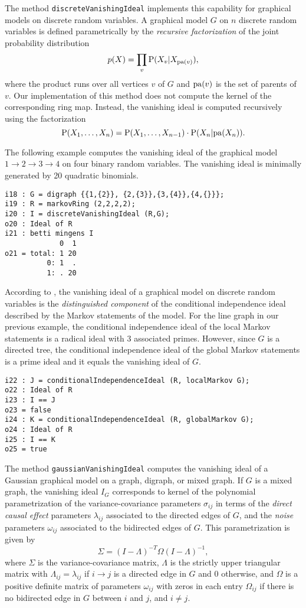 \documentclass[letterpaper]{article}
\theoremstyle{definition}
\newcommand{\pa}{{\rm pa}}
\begin{document}
The method
{\tt discreteVanishingIdeal} implements this capability for graphical
models on discrete random variables. A graphical model $G$ on $n$ discrete random variables 
is defined parametrically by the
\emph{recursive factorization} of the joint probability  distribution
\[p(X) = \prod_{v} {\rm P}(X_{v} | X_{\pa(v)}),\]
where the product runs over all vertices $v$ of $G$ and $\pa(v)$ is the set of
parents of $v$. 
Our implementation of this method does not compute the kernel of the
corresponding ring map. Instead, the vanishing ideal is
computed recursively using the factorization 
\[{\rm P}(X_{1},\dots, X_{n}) = {\rm P}(X_{1},\dots, X_{n-1})\cdot {\rm P}(X_{n} | \pa(X_{n})).\]

The following example computes the vanishing ideal of the graphical model $1\to
2 \to 3\to 4$ on four binary random variables. The vanishing ideal is
minimally generated by 20 quadratic binomials.

\begin{verbatim}
i18 : G = digraph {{1,{2}}, {2,{3}},{3,{4}},{4,{}}};
i19 : R = markovRing (2,2,2,2);
i20 : I = discreteVanishingIdeal (R,G);
o20 : Ideal of R
i21 : betti mingens I
             0  1
o21 = total: 1 20
          0: 1  .
          1: . 20
\end{verbatim}

According to \cite{GSS}, the vanishing ideal of a graphical model on discrete
random variables is the \emph{distinguished
  component} of the conditional independence ideal described by the Markov
statements of the model. For the line graph in our previous example, the
conditional independence ideal of the local Markov statements 
is a radical ideal with 3 associated primes. However, since $G$ is a directed
tree, the conditional independence ideal of the global Markov statements is a
prime ideal and it equals the vanishing ideal of $G$.

 \begin{verbatim}
i22 : J = conditionalIndependenceIdeal (R, localMarkov G);
o22 : Ideal of R
i23 : I == J
o23 = false
i24 : K = conditionalIndependenceIdeal (R, globalMarkov G);
o24 : Ideal of R
i25 : I == K
o25 = true
\end{verbatim}

The method {\tt gaussianVanishingIdeal} computes the vanishing ideal of a
Gaussian graphical model on a graph, digraph, or mixed graph. If $G$ is a mixed
graph, 
the vanishing ideal $I_{G}$ corresponds to kernel of the polynomial parametrization of the
variance-covariance parameters  $\sigma_{ij}$ in terms of the \emph{direct
  causal effect} parameters $\lambda_{ij}$ associated to the directed edges of $G$,   
and the \emph{noise} parameters $\omega_{ij}$ associated to the
bidirected edges of $G$. This parametrization is  given by
\[\Sigma = (I - \Lambda)^{-T}\Omega(I-\Lambda)^{-1},\] 
where $\Sigma$ is the variance-covariance matrix, $\Lambda$ is the strictly
upper triangular matrix with $\Lambda_{ij} = \lambda_{ij}$ if $i\to j$ is a
directed edge in $G$ and 0 otherwise, and $\Omega$ is a positive definite
matrix of parameters $\omega_{ij}$ with zeros in each entry $\Omega_{ij}$ if there is no
bidirected edge in $G$ between $i$ and $j$, and $i\neq j$.
\end{document}
